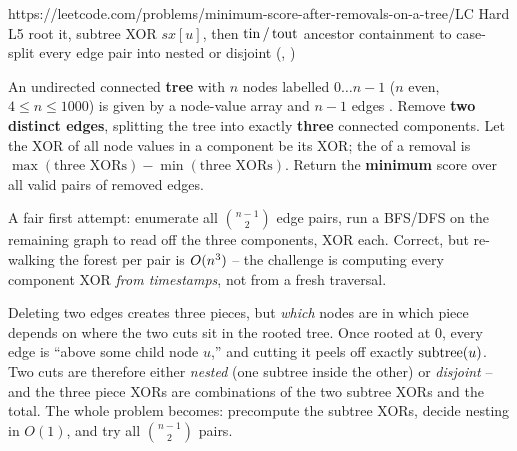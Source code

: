   {https://leetcode.com/problems/minimum-score-after-removals-on-a-tree/}{LC Hard L5}
  {root it, subtree XOR $\mathit{sx}[u]$, then $\operatorname{tin}/\operatorname{tout}$ ancestor containment to case-split
   every edge pair into nested or disjoint (, )}

\begin{problemstatement}
An undirected connected \textbf{tree} with $n$ nodes labelled $0\dots n{-}1$ ($n$ even,
$4\le n\le 1000$) is given by a node-value array  and $n-1$ edges
. Remove \textbf{two distinct edges}, splitting the tree into exactly
\textbf{three} connected components. Let the XOR of all node values in a component be its XOR;
the  of a removal is $\max(\text{three XORs})-\min(\text{three XORs})$. Return the
\textbf{minimum} score over all valid pairs of removed edges.
\end{problemstatement}

\begin{attemptgate}
A fair first attempt: enumerate all $\binom{n-1}{2}$ edge pairs, run a BFS/DFS on the remaining
graph to read off the three components, XOR each. Correct, but re-walking the forest per pair is
$O(n^3)$ -- the challenge is computing every component XOR \emph{from timestamps}, not from
a fresh traversal.
\end{attemptgate}

Deleting two edges creates three pieces, but \emph{which} nodes are in which piece depends on
where the two cuts sit in the rooted tree. Once rooted at $0$, every edge is ``above some child
node $u$,'' and cutting it peels off exactly $\operatorname{subtree}(u)$. Two cuts are therefore either
\emph{nested} (one subtree inside the other) or \emph{disjoint} -- and the three piece XORs are
combinations of the two subtree XORs and the total. The whole problem becomes: precompute the
subtree XORs, decide nesting in $O(1)$, and try all $\binom{n-1}{2}$ pairs.

